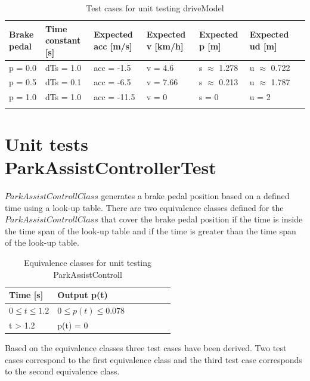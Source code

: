\begin{table}[H]
\centering
\caption{Test cases for unit testing driveModel}
\begin{adjustbox}{width=1\textwidth, center=\textwidth}
\renewcommand{\arraystretch}{1}
\begin{tabular}{lllllll}
\textbf{Brake pedal} & \textbf{Time constant [s]} & \textbf{Expected acc [m/s]} &\textbf{Expected v [km/h]} & \textbf{Expected p [m]} & \textbf{Expected ud [m]} \\\hline
p = 0.0 & dTs = 1.0 & acc = -1.5 & v = 4.6 & s $\approx$ 1.278 & u $\approx$ 0.722\\
p = 0.5 & dTs = 0.1 & acc = -6.5 & v = 7.66 & s $\approx$ 0.213 & u $\approx$ 1.787\\
p = 1.0 & dTs = 1.0 & acc = -11.5 & v = 0 & s = 0 & u = 2\\
\label{tab:D10_drivemodel}
\end{tabular}
\end{adjustbox}
\end{table}

\section{Unit tests ParkAssistControllerTest}

$ParkAssistControllClass$ generates a brake pedal position based on a defined time using a look-up table.
There are two equivalence classes defined for the $ParkAssistControllClass$ that cover the brake pedal position if the time is inside the time span of the look-up table and if the time is greater than the time span of the look-up table.

\begin{table}[H]
\centering
\caption{Equivalence classes for unit testing ParkAssistControll}
\begin{adjustbox}{width=0.5\textwidth, center=\textwidth}
\renewcommand{\arraystretch}{1}
\begin{tabular}{lllllll}
\textbf{Time [s]} & \textbf{Output p(t)} \\\hline
$0 \leq t \leq 1.2$ &$ 0 \leq p(t) \leq 0.078$ \\
t > 1.2 & p(t) = 0\\
\end{tabular}
\end{adjustbox}
\end{table}

Based on the equivalence classes three test cases have been derived. Two test cases correspond to the first equivalence class and the third test case corresponds to the second equivalence class. 

